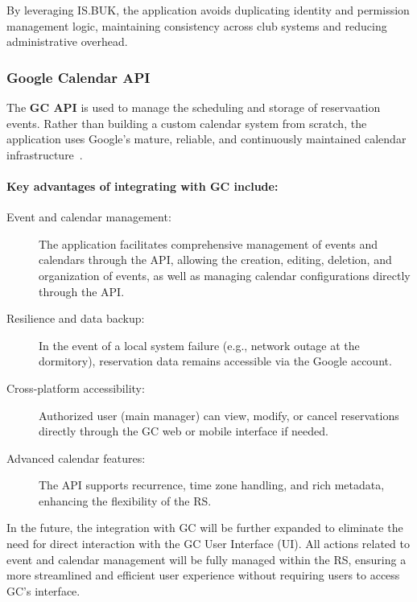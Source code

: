 By leveraging IS.BUK, the application avoids duplicating identity and permission management logic, maintaining consistency across club systems and reducing administrative overhead.

\subsubsection{Google Calendar API}

The \textbf{GC API} is used to manage the scheduling and storage of reservaation events. Rather than building a custom calendar system from scratch, the application uses Google’s mature, reliable, and continuously maintained calendar infrastructure~\cite{googleCalendarAPI}.

\paragraph{Key advantages of integrating with GC include:}

\begin{description}
  \item[Event and calendar management:] The application facilitates comprehensive management of events and calendars through the API, allowing the creation, editing, deletion, and organization of events, as well as managing calendar configurations directly through the API.
  \item[Resilience and data backup:] In the event of a local system failure (e.g., network outage at the dormitory), reservation data remains accessible via the Google account.
  \item[Cross-platform accessibility:] Authorized user (main manager) can view, modify, or cancel reservations directly through the GC web or mobile interface if needed.
  \item[Advanced calendar features:] The API supports recurrence, time zone handling, and rich metadata, enhancing the flexibility of the RS.
\end{description}


In the future, the integration with GC will be further expanded to eliminate the need for direct interaction with the GC User Interface (UI). All actions related to event and calendar management will be fully managed within the RS, ensuring a more streamlined and efficient user experience without requiring users to access GC’s interface.

